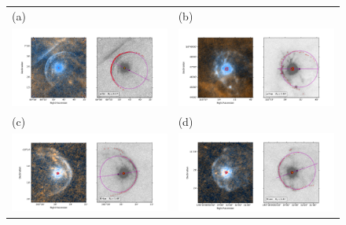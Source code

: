 \documentclass[useAMS, usenatbib, a4paper]{mnras}
\begin{document}
\begin{figure}
  \setlength\tabcolsep{0pt}
  \begin{tabular}{ll}
    (a) & (b) \\
    \includegraphics[trim=10 0 65 20, clip]{figs/alphaori-imageplot}
    & \includegraphics[trim=10 0 65 20, clip]{figs/mucep-imageplot}\\
    (c) & (d) \\
    \includegraphics[trim=10 0 65 20, clip]{figs/rhya-imageplot}
    & \includegraphics[trim=10 0 65 20, clip]{figs/rleo-imageplot}\\

\end{tabular}
\end{figure}
\end{document}
